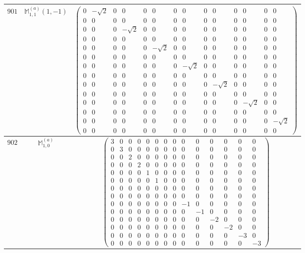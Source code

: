 \documentclass[fleqn,8pt,landscape]{jsarticle}
\begin{document}
\begin{center}
\begin{longtable}{ccc}
$ 901 $ & $ \mathbb{M}_{1,1}^{(a)}(1,-1) $ & $ \begin{pmatrix} 0 & - \sqrt{2} & 0 & 0 & 0 & 0 & 0 & 0 & 0 & 0 & 0 & 0 & 0 & 0 \\ 0 & 0 & 0 & 0 & 0 & 0 & 0 & 0 & 0 & 0 & 0 & 0 & 0 & 0 \\ 0 & 0 & 0 & - \sqrt{2} & 0 & 0 & 0 & 0 & 0 & 0 & 0 & 0 & 0 & 0 \\ 0 & 0 & 0 & 0 & 0 & 0 & 0 & 0 & 0 & 0 & 0 & 0 & 0 & 0 \\ 0 & 0 & 0 & 0 & 0 & - \sqrt{2} & 0 & 0 & 0 & 0 & 0 & 0 & 0 & 0 \\ 0 & 0 & 0 & 0 & 0 & 0 & 0 & 0 & 0 & 0 & 0 & 0 & 0 & 0 \\ 0 & 0 & 0 & 0 & 0 & 0 & 0 & - \sqrt{2} & 0 & 0 & 0 & 0 & 0 & 0 \\ 0 & 0 & 0 & 0 & 0 & 0 & 0 & 0 & 0 & 0 & 0 & 0 & 0 & 0 \\ 0 & 0 & 0 & 0 & 0 & 0 & 0 & 0 & 0 & - \sqrt{2} & 0 & 0 & 0 & 0 \\ 0 & 0 & 0 & 0 & 0 & 0 & 0 & 0 & 0 & 0 & 0 & 0 & 0 & 0 \\ 0 & 0 & 0 & 0 & 0 & 0 & 0 & 0 & 0 & 0 & 0 & - \sqrt{2} & 0 & 0 \\ 0 & 0 & 0 & 0 & 0 & 0 & 0 & 0 & 0 & 0 & 0 & 0 & 0 & 0 \\ 0 & 0 & 0 & 0 & 0 & 0 & 0 & 0 & 0 & 0 & 0 & 0 & 0 & - \sqrt{2} \\ 0 & 0 & 0 & 0 & 0 & 0 & 0 & 0 & 0 & 0 & 0 & 0 & 0 & 0 \end{pmatrix} $ \\ \hline
$ 902 $ & $ \mathbb{M}_{1,0}^{(a)} $ & $ \begin{pmatrix} 3 & 0 & 0 & 0 & 0 & 0 & 0 & 0 & 0 & 0 & 0 & 0 & 0 & 0 \\ 0 & 3 & 0 & 0 & 0 & 0 & 0 & 0 & 0 & 0 & 0 & 0 & 0 & 0 \\ 0 & 0 & 2 & 0 & 0 & 0 & 0 & 0 & 0 & 0 & 0 & 0 & 0 & 0 \\ 0 & 0 & 0 & 2 & 0 & 0 & 0 & 0 & 0 & 0 & 0 & 0 & 0 & 0 \\ 0 & 0 & 0 & 0 & 1 & 0 & 0 & 0 & 0 & 0 & 0 & 0 & 0 & 0 \\ 0 & 0 & 0 & 0 & 0 & 1 & 0 & 0 & 0 & 0 & 0 & 0 & 0 & 0 \\ 0 & 0 & 0 & 0 & 0 & 0 & 0 & 0 & 0 & 0 & 0 & 0 & 0 & 0 \\ 0 & 0 & 0 & 0 & 0 & 0 & 0 & 0 & 0 & 0 & 0 & 0 & 0 & 0 \\ 0 & 0 & 0 & 0 & 0 & 0 & 0 & 0 & -1 & 0 & 0 & 0 & 0 & 0 \\ 0 & 0 & 0 & 0 & 0 & 0 & 0 & 0 & 0 & -1 & 0 & 0 & 0 & 0 \\ 0 & 0 & 0 & 0 & 0 & 0 & 0 & 0 & 0 & 0 & -2 & 0 & 0 & 0 \\ 0 & 0 & 0 & 0 & 0 & 0 & 0 & 0 & 0 & 0 & 0 & -2 & 0 & 0 \\ 0 & 0 & 0 & 0 & 0 & 0 & 0 & 0 & 0 & 0 & 0 & 0 & -3 & 0 \\ 0 & 0 & 0 & 0 & 0 & 0 & 0 & 0 & 0 & 0 & 0 & 0 & 0 & -3 \end{pmatrix} $ \\ \hline

\end{longtable}
\end{center}
\end{document}
